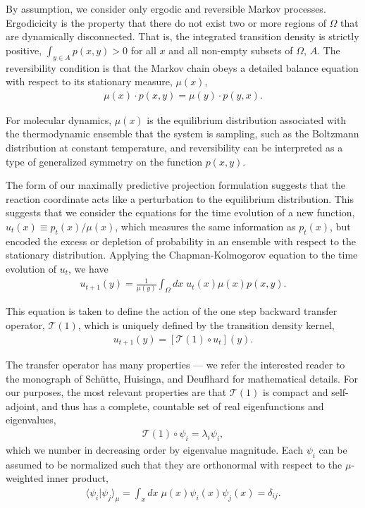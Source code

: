 \documentclass[aip, jcp, reprint, nolinenumbers, twocolumn, nobalancelastpage, nofootinbib]{revtex4-1}
\begin{document}
By assumption, we consider only ergodic and reversible Markov processes. Ergodicicity is the property that there do not exist two or more regions of $\Omega$ that are dynamically disconnected. That is, the integrated transition density is strictly positive, $\int_{y \in A} p(x, y) > 0$ for all $x$ and all non-empty subsets of $\Omega$, $A$. The reversibility condition is that the Markov chain obeys a detailed balance equation with respect to its stationary measure, $\mu(x)$,
\begin{align}
    \mu(x) \cdot p(x, y) = \mu(y) \cdot p(y,x).
\end{align}

For molecular dynamics, $\mu(x)$ is the equilibrium distribution associated with the thermodynamic ensemble that the system is sampling, such as the Boltzmann distribution at constant temperature, and reversibility can be interpreted as a type of generalized symmetry on the function $p(x, y)$.

The form of our maximally predictive projection formulation suggests that the reaction coordinate acts like a perturbation to the equilibrium distribution. This suggests that we consider the equations for the time evolution of a new function, $u_t(x) \equiv p_t(x)/\mu(x)$, which measures the same information as $p_t(x)$, but encoded the excess or depletion of probability in an ensemble with respect to the stationary distribution. Applying the Chapman-Kolmogorov equation to the time evolution of $u_t$, we have
\begin{align}
    u_{t+1}(y) = \frac{1}{\mu(y)} \int_{\Omega} dx\; u_t(x) \mu(x) p(x, y).
\end{align}

This equation is taken to define the action of the one step backward transfer operator, $\mathcal{T}(1)$, which is uniquely defined by the transition density kernel,
\begin{align}
    u_{t+1}(y) = [\mathcal{T}(1) \circ u_t](y).
\end{align}

The transfer operator has many properties --- we refer the interested reader to the monograph of Sch\"utte, Huisinga, and Deuflhard for mathematical details. \cite{schutte2001transfer} For our purposes, the most relevant properties are that $\mathcal{T}(1)$ is compact and self-adjoint, and thus has a complete, countable set of real eigenfunctions and eigenvalues,
\begin{align}
    \mathcal{T}(1) \circ \psi_i = \lambda_i \psi_i,
\end{align}
which we number in decreasing order by eigenvalue magnitude. Each $\psi_i$ can be assumed to be normalized such that they are orthonormal with respect to the $\mu$-weighted inner product,
\begin{align}
    \langle \psi_i | \psi_j \rangle_\mu = \int_x dx\; \mu(x) \psi_i(x) \psi_j(x) = \delta_{ij}.
\end{align}
\end{document}
